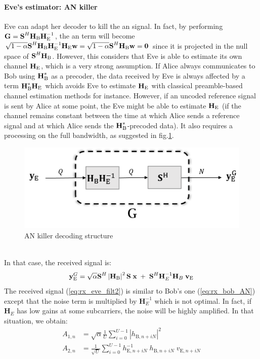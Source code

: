 \paragraph{Eve's estimator: AN killer}
\label{par:perf_an_suppression}
Eve can adapt her decoder to kill the \gls{an} signal. In fact, by performing $\textbf{G} = \textbf{S}^H \textbf{H}_\text{B} \textbf{H}^{-1}_\text{E}$, the \gls{an} term will become $\sqrt{1-\alpha}\textbf{S}^H \textbf{H}_\text{B} \textbf{H}^{-1}_\text{E} \textbf{H}_\text{E} \textbf{w} = \sqrt{1-\alpha}\textbf{S}^H \textbf{H}_\text{B}  \textbf{w} = \textbf{0}$ since it is projected in the null space of $\textbf{S}^H\textbf{H}_\text{B}$. However, this considers that Eve is able to estimate its own channel $\textbf{H}_{\text{E}}$, which is a very strong assumption. If Alice always communicates to Bob using $\textbf{H}_{\text{B}}^*$ as a precoder, the data received by Eve is always affected by a term $\textbf{H}_{\text{B}}^*\textbf{H}_{\text{E}}$ which avoids Eve to estimate $\textbf{H}_{\text{E}}$ with classical preamble-based channel estimation methods for instance. However, if an uncoded reference signal is sent by Alice at some point, the Eve might be able to estimate $\textbf{H}_{\text{E}}$ (if the channel remains constant between the time at which Alice sends a reference signal and at which Alice sends the $\textbf{H}_{\text{B}}^*$-precoded data). It also requires a processing on the full bandwidth, as suggested in fig.\ref{fig:an_killer}. 
\begin{figure}[htb!]
    \centering
    \includegraphics[width=.5\linewidth]{img/AN_killer.png}
    \caption{AN killer decoding structure}
    \label{fig:an_killer}
\end{figure}\\
In that case, the received signal is:
\begin{equation}
    \textbf{y}_{\text{E}}^G = \sqrt{\alpha} \textbf{S}^H \left|\textbf{H}_{\text{B}}\right|^2 \textbf{S}\; \textbf{x} \; +  \; \textbf{S}^H  \textbf{H}^{-1}_E \textbf{H}_B \;\textbf{v}_{\text{E}}
    \label{eq:rx_eve_filt2}
\end{equation}
The received signal (\ref{eq:rx_eve_filt2}) is similar to Bob's one (\ref{eq:rx_bob_AN}) except that the noise term is multiplied by $\textbf{H}^{-1}_E$ which is not optimal. In fact, if $\textbf{H}_E$ has low gains at some subcarriers, the noise will be highly amplified. In that situation, we obtain:
\begin{equation}
    \begin{split}
        A_{1,n} &= \sqrt{\alpha}\frac{1}{U}\sum_{i=0}^{U-1}  \left|h_{\text{B}, n + iN}\right|^2\\
        A_{2,n} &= \frac{1}{\sqrt{U}}\sum_{i=0}^{U-1} h^{-1}_{\text{E}, n + iN} \; h_{\text{B}, n + iN} \; v_{\text{E}, n + iN}
    \end{split}
\end{equation}
